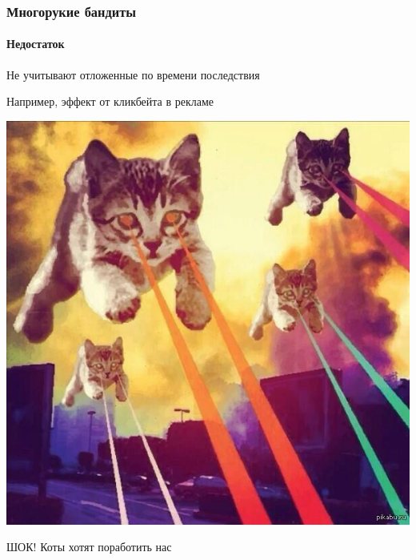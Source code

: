 \documentclass[fullscreen=true, bookmarks=true, hyperref={pdfencoding=unicode}]{beamer}
\begin{document}
\begin{frame}
  \frametitle{Многорукие бандиты}
  \framesubtitle{Недостаток}

  Не учитывают отложенные по времени последствия

  Например, эффект от кликбейта в рекламе

  \pause
  \begin{center}
    \includegraphics[keepaspectratio,
                     width=.45\paperwidth]{cats_invaders.jpg}

    ШОК! Коты хотят поработить нас
  \end{center}

\end{frame}
\end{document}
